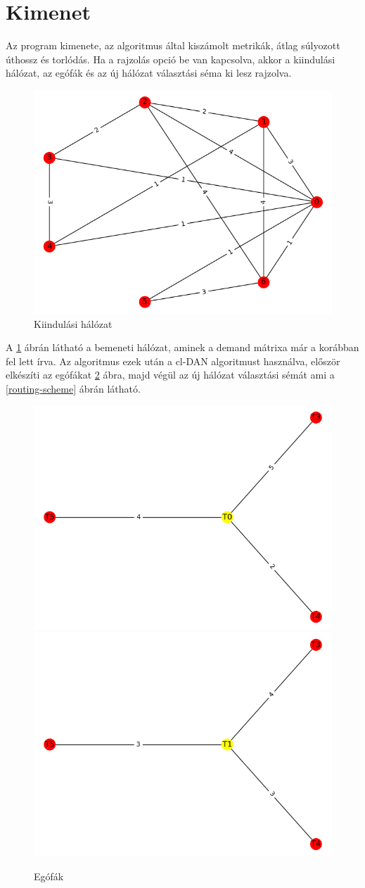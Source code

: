 \documentclass[12pt]{report}
\begin{document}
\section{Kimenet}

Az program kimenete, az algoritmus által kiszámolt metrikák, átlag súlyozott úthossz és torlódás. 
Ha a rajzolás opció be van kapcsolva, akkor a kiindulási hálózat, az egófák és az új hálózat választási séma ki lesz rajzolva.

\begin{figure}[h]
	\begin{center}
		\includegraphics[width=0.49\linewidth]{pictures/starting_network.png}
		\caption{Kiindulási hálózat}
		\label{starting-network}
	\end{center}
\end{figure}

A \ref{starting-network} ábrán látható a bemeneti hálózat, aminek a demand mátrixa már a korábban fel lett írva. Az algoritmus ezek után a cl-DAN algoritmust használva, először elkészíti az egófákat \ref{ego-trees} ábra, majd végül az új hálózat választási sémát ami a \ref{routing-scheme} ábrán látható.

\begin{figure}[h]
	\begin{center}
		\includegraphics[width=0.40\linewidth]{pictures/egotree1.png}
		\includegraphics[width=0.40\linewidth]{pictures/egotree2.png}
		\caption{Egófák}
		\label{ego-trees}
	\end{center}
\end{figure}
\end{document}
